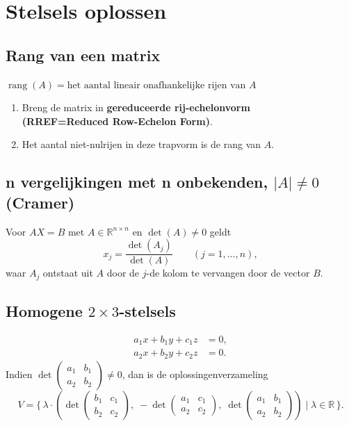 \documentclass[a5paper]{article}
\begin{document}
\newpage

\section{Stelsels oplossen}

\subsection{Rang van een matrix}
$ \operatorname{rang}(A) = \text{het aantal lineair onafhankelijke rijen van } A $

\begin{enumerate}
  \item Breng de matrix in \textbf{gereduceerde rij-echelonvorm \scriptsize \\ (RREF=Reduced Row-Echelon Form)}.
  
  \item Het aantal niet-nulrijen in deze trapvorm is de rang van \(A\).
\end{enumerate}

\subsection{n vergelijkingen met n onbekenden, $|A|\neq 0$ (Cramer)}
Voor $AX=B$ met $A\in\mathbb{R}^{n\times n}$ en $\det(A)\neq0$ geldt
\[
x_j = \frac{\det(A_j)}{\det(A)} \qquad (j=1,\dots,n),
\]
waar $A_j$ ontstaat uit $A$ door de $j$-de kolom te vervangen door de vector $B$.

\subsection{Homogene $2\times 3$-stelsels}
\begin{align*}
a_1 x + b_1 y + c_1 z &= 0, \\
a_2 x + b_2 y + c_2 z &= 0.
\end{align*}
Indien $\det\!\begin{pmatrix} a_1 & b_1 \\ a_2 & b_2 \end{pmatrix}\neq0$, dan is de oplossingenverzameling
\[
V = \{\, \lambda \cdot (\det\!\begin{pmatrix} b_1 & c_1 \\ b_2 & c_2 \end{pmatrix}, \;
          -\det\!\begin{pmatrix} a_1 & c_1 \\ a_2 & c_2 \end{pmatrix}, \;
           \det\!\begin{pmatrix} a_1 & b_1 \\ a_2 & b_2 \end{pmatrix}) \mid \lambda\in\mathbb{R}\,\}.
\]
\end{document}
